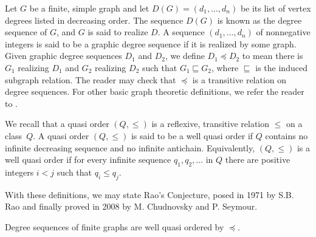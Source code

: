 \documentclass[review]{elsarticle}
\begin{document}

Let $G$ be a finite, simple graph and let $D(G)=(d_1,\ldots,d_n)$
be its list of vertex degrees listed in decreasing order.
The sequence $D(G)$
is known as the degree sequence of $G$, and $G$ is said to realize
$D$. A sequence $(d_1,\ldots,d_n)$ of nonnegative integers is said
to be a graphic degree sequence if it is realized by some graph.
Given graphic degree sequences $D_1$ and $D_2$, we define $D_1\preceq D_2$
to mean there is $G_1$ realizing $D_1$ and $G_2$ realizing $D_2$
such that $G_1\sqsubseteq G_2$, where $\sqsubseteq$ is the induced
subgraph relation. The reader may check
that $\preceq$ is a transitive relation on degree sequences.
For other basic graph theoretic definitions, we refer the
reader to \cite{diestel_book}.

We recall that a quasi order $(Q,\le)$ is a reflexive, transitive
relation $\le$ on a class~$Q$.
A quasi order $(Q,\le)$ is said to be a well quasi order
if $Q$ contains no infinite decreasing sequence and no infinite
antichain. Equivalently, $(Q,\le)$ is a well quasi order if for every
infinite sequence $q_1,q_2,\ldots$
in $Q$ there are positive
integers $i<j$ such that $q_i\le q_j$.

With these definitions, we may state Rao's Conjecture, posed in
1971 by S.B. Rao\cite{rao_private}
and finally proved in 2008 by M. Chudnovsky and
P. Seymour\cite{proof_rao}.

\def\mod{\hbox{mod}}

\begin{thm} \label{raos_conj}
Degree sequences of finite graphs are well quasi ordered by $\preceq$.
\end{thm}
\end{document}
